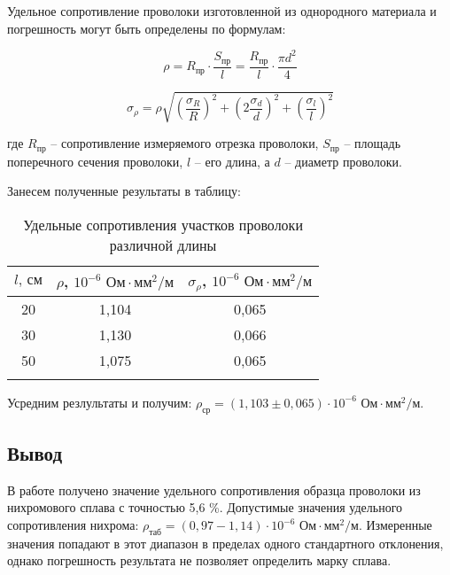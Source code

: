 \documentclass[a4paper, 12pt]{article}
\begin{document}
	Удельное сопротивление проволоки изготовленной из однородного материала и погрешность могут быть определены по формулам:
	
	\begin{minipage}{0.45\textwidth}
		\centering
		\begin{equation}
			\rho = R_\text{пр}\cdot\frac{S_\text{пр}}{l} = \frac{R_\text{пр}}{l} \cdot \frac{\pi d^2}{4}
		\end{equation}
	\end{minipage}
	\begin{minipage}{0.45\textwidth}
		\centering
		\begin{equation}
			\sigma_\rho = \rho\sqrt{\left(\frac{\sigma_R}{R}\right)^2 + \left( 2\frac{\sigma_d}{d} \right)^2 + \left( \frac{\sigma_l}{l}\right)^2}
		\end{equation}
		
	\end{minipage}
	
	\bigskip
	\noindent где $R_\text{пр}$ -- сопротивление измеряемого отрезка проволоки, $S_\text{пр}$ -- площадь поперечного сечения проволоки, $l$ -- его длина, а $d$ -- диаметр проволоки.
	
	Занесем полученные результаты в таблицу:
	\begin{longtable}[H]{|c||c||c|}
		\hline
		$l \text{, см}$ & $\rho$, $ 10^{-6} \text{ Ом} \cdot \text{мм}^2 /\text{м}$ & $\sigma_\rho$, $ 10^{-6} \text{ Ом} \cdot \text{мм}^2 / \text{м}$\\
		\hline
		20 & 1,104 & 0,065\\
		\hline
		30 & 1,130 & 0,066\\
		\hline
		50 & 1,075 & 0,065\\
		\hline
		\caption{Удельные сопротивления участков проволоки различной длины}
	\end{longtable}

	Усредним резлультаты и получим: $\rho_{\text{ср}} = \left( 1,103 \pm 0,065 \right) \cdot 10^{-6} \text{ Ом}\cdot \text{мм}^2/\text{м}$.
	
	\subsection*{Вывод}
	
	В работе получено значение удельного сопротивления образца проволоки из нихромового сплава с точностью 5,6 \%. Допустимые значения удельного сопротивления нихрома: $\rho_\text{таб} = (0,97 - 1,14) \cdot 10^{-6} \text{ Ом}\cdot \text{мм}^2/\text{м}$. Измеренные значения попадают в этот диапазон в пределах одного стандартного отклонения, однако погрешность результата не позволяет определить марку сплава.
 
\end{document}
